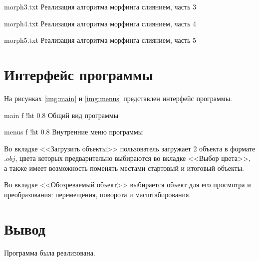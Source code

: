 \clearpage

{morph3.txt}
{Реализация алгоритма морфинга слиянием, часть 3}

\clearpage

{morph4.txt}
{Реализация алгоритма морфинга слиянием, часть 4}

\clearpage

{morph5.txt}
{Реализация алгоритма морфинга слиянием, часть 5}

\clearpage

\section{Интерфейс программы}

На рисунках \ref{img:main} и \ref{img:menus} представлен интерфейс программы.

{main}
{f}
{!ht}
{0.8\textwidth}
{Общий вид программы}

{menus}
{f}
{!ht}
{0.8\textwidth}
{Внутренние меню программы}

Во вкладке <<Загрузить объекты>> пользователь загружает 2 объекта в формате $.obj$, цвета которых предварительно выбираются во вкладке <<Выбор цвета>>, а также имеет возможность поменять местами стартовый и итоговый объекты.

Во вкладке <<Обозреваемый объект>> выбирается объект для его просмотра и преобразования: перемещения, поворота и масштабирования.

\section*{Вывод}
Программа была реализована.


